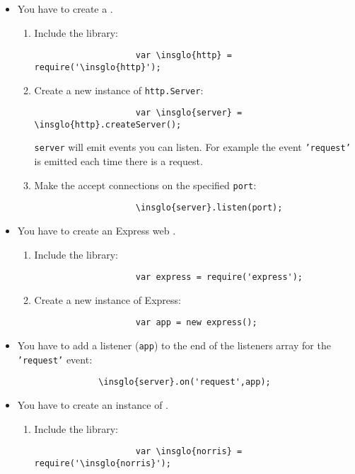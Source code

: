 		\begin{itemize}
			\item You have to create a  .
			\begin{enumerate}
				\item Include the library:
				\begin{lstlisting}
					var \insglo{http} = require('\insglo{http}');
				\end{lstlisting}
				\item Create a new instance of \texttt{http.Server}:
				\begin{lstlisting}
					var \insglo{server} = \insglo{http}.createServer();
				\end{lstlisting}
				\texttt{server} will emit events you can listen. For example the event \texttt{'request'} is emitted each time there is a request.
				\item Make the   accept connections on the specified \texttt{port}:
				\begin{lstlisting}
					\insglo{server}.listen(port);
				\end{lstlisting}
			\end{enumerate}
			\item You have to create an Express web .
			\begin{enumerate}
				\item Include the library:
				\begin{lstlisting}
					var express = require('express');
				\end{lstlisting}
				\item Create a new instance of Express:
				\begin{lstlisting}
					var app = new express();
				\end{lstlisting}
			\end{enumerate}
			\item You have to add a listener (\texttt{app}) to the end of the listeners array for the \texttt{'request'} event:
			\begin{lstlisting}
				\insglo{server}.on('request',app);
			\end{lstlisting}
			\item You have to create an instance of .
			\begin{enumerate}
				\item Include the library:
				\begin{lstlisting}
					var \insglo{norris} = require('\insglo{norris}');

\end{lstlisting}
\end{enumerate}
\end{itemize}
